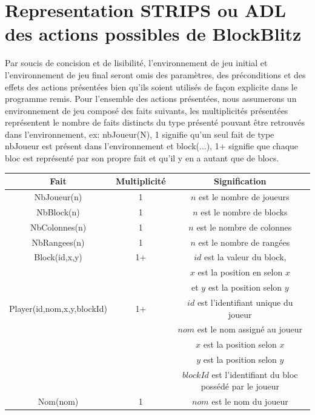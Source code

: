 \documentclass[12pt,english,frenchb,letterpaper]{article}
\begin{document}
\section{Representation STRIPS ou ADL des actions possibles de BlockBlitz}
Par soucis de concision et de lisibilité, l'environnement de jeu initial et l'environnement de jeu final seront omis des paramètres, des préconditions et des effets des actions présentées bien qu'ils soient utilisés de fa\c con explicite dans le programme remis.  Pour l'ensemble des actions présentées, nous assumerons un environnement de jeu composé des faits suivants, les multiplicités présentées représentent le nombre de faits distincts du type présenté pouvant être retrouvés dans l'environnement, ex: nbJoueur(N), 1 signifie qu'un seul fait de type nbJoueur est présent dans l'environnement et block(...), 1+ signifie que chaque bloc est représenté par son propre fait et qu'il y en a autant que de blocs.

\begin{center}
  \begin{tabular}{@{} ccc @{}}
    \hline
    Fait & Multiplicité & Signification \\ 
    \hline
    NbJoueur(n) & 1 & $n$ est le nombre de joueurs \\ 
    NbBlock(n) & 1 & $n$ est le nombre de blocks \\ 
    NbColonnes(n) & 1 & $n$ est le nombre de colonnes \\ 
    NbRangees(n) & 1 & $n$ est le nombre de rangées \\ 
    Block(id,x,y) & 1+ & $id$ est la valeur du block, \\
                                  && $x$ est la position en selon $x$ \\
                                  && et $y$ est la position selon $y$ \\ 
    Player(id,nom,x,y,blockId) & 1+ & $id$ est l'identifiant unique du joueur \\
                                                              && $nom$ est le nom assigné au joueur \\ 
                                                              && $x$ est la position selon $x$ \\
                                                              && $y$ est la position selon $y$ \\
                                                              && $blockId$ est l'identifiant du bloc possédé par le joueur\\
    Nom(nom) & 1 & $nom$ est le nom du joueur \\ 
    \hline
  \end{tabular}
\end{center}
\end{document}
